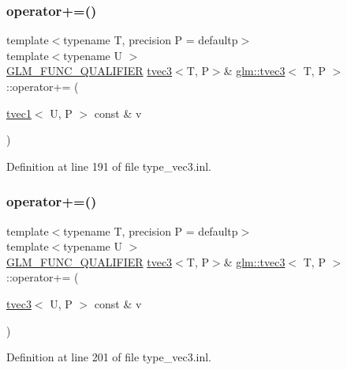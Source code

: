 \subsubsection{\texorpdfstring{operator+=()}{operator+=()}\hspace{0.1cm}{\footnotesize\ttfamily [5/6]}}
{\footnotesize\ttfamily template$<$typename T, precision P = defaultp$>$ \\
template$<$typename U $>$ \\
\mbox{\hyperlink{setup_8hpp_a33fdea6f91c5f834105f7415e2a64407}{G\+L\+M\+\_\+\+F\+U\+N\+C\+\_\+\+Q\+U\+A\+L\+I\+F\+I\+ER}} \mbox{\hyperlink{structglm_1_1tvec3}{tvec3}}$<$T, P$>$\& \mbox{\hyperlink{structglm_1_1tvec3}{glm\+::tvec3}}$<$ T, P $>$\+::operator+= (\begin{DoxyParamCaption}\item[{\mbox{\hyperlink{structglm_1_1tvec1}{tvec1}}$<$ U, P $>$ const \&}]{v }\end{DoxyParamCaption})}



Definition at line 191 of file type\+\_\+vec3.\+inl.

\mbox{\label{structglm_1_1tvec3_a8c4047ef94643db0f346827041366fd2}} 
\subsubsection{\texorpdfstring{operator+=()}{operator+=()}\hspace{0.1cm}{\footnotesize\ttfamily [6/6]}}
{\footnotesize\ttfamily template$<$typename T, precision P = defaultp$>$ \\
template$<$typename U $>$ \\
\mbox{\hyperlink{setup_8hpp_a33fdea6f91c5f834105f7415e2a64407}{G\+L\+M\+\_\+\+F\+U\+N\+C\+\_\+\+Q\+U\+A\+L\+I\+F\+I\+ER}} \mbox{\hyperlink{structglm_1_1tvec3}{tvec3}}$<$T, P$>$\& \mbox{\hyperlink{structglm_1_1tvec3}{glm\+::tvec3}}$<$ T, P $>$\+::operator+= (\begin{DoxyParamCaption}\item[{\mbox{\hyperlink{structglm_1_1tvec3}{tvec3}}$<$ U, P $>$ const \&}]{v }\end{DoxyParamCaption})}



Definition at line 201 of file type\+\_\+vec3.\+inl.

